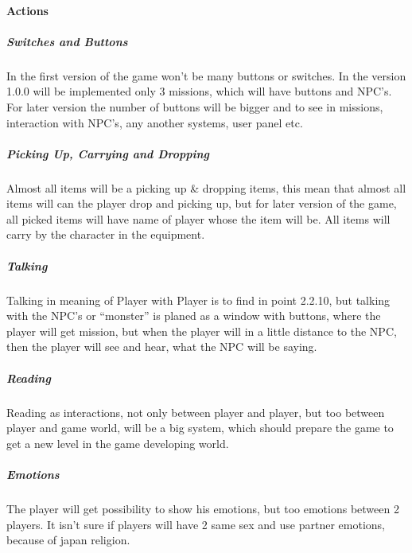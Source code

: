 \documentclass[parskip=full]{scrartcl}
\begin{document}
					\paragraph{Actions} \vspace{-5mm}
						\subparagraph{Switches and Buttons} \vspace{-5mm}
							\par \begingroup
							\leftskip=2cm
							\noindent
									In the first version of the game won’t be many buttons or switches. In the version 1.0.0 will be implemented only 3 missions, which will have buttons and NPC’s. For later version the number of buttons will be bigger and to see in missions, interaction with NPC’s, any another systems, user panel etc.
							\par \endgroup
						\subparagraph{Picking Up, Carrying and Dropping} \vspace{-5mm}
							\par \begingroup
							\leftskip=2cm
							\noindent
									Almost all items will be a picking up \& dropping items, this mean that almost all items will can the player drop and picking up, but for later version of the game, all picked items will have name of player whose the item will be. All items will carry by the character in the equipment. 
							\par \endgroup
						\subparagraph{Talking} \vspace{-5mm}
							\par \begingroup
							\leftskip=2cm
							\noindent
									Talking in meaning of Player with Player is to find in point 2.2.10, but talking with the NPC’s or “monster” is planed as a window with buttons, where the player will get mission, but when the player will in a little distance to the NPC, then the player will see and hear, what the NPC will be saying. 
							\par \endgroup
						\subparagraph{Reading} \vspace{-5mm}
							\par \begingroup
							\leftskip=2cm
							\noindent
									Reading as interactions, not only between player and player, but too between player and game world, will be a big system, which should prepare the game to get a new level in the game developing world.
							\par \endgroup
						\subparagraph{Emotions} \vspace{-5mm}
							\par \begingroup
							\leftskip=2cm
							\noindent
									The player will get possibility to show his emotions, but too emotions between 2 players. It isn’t sure if players will have 2 same sex and use partner emotions, because of japan religion.
							\par \endgroup
\end{document}
